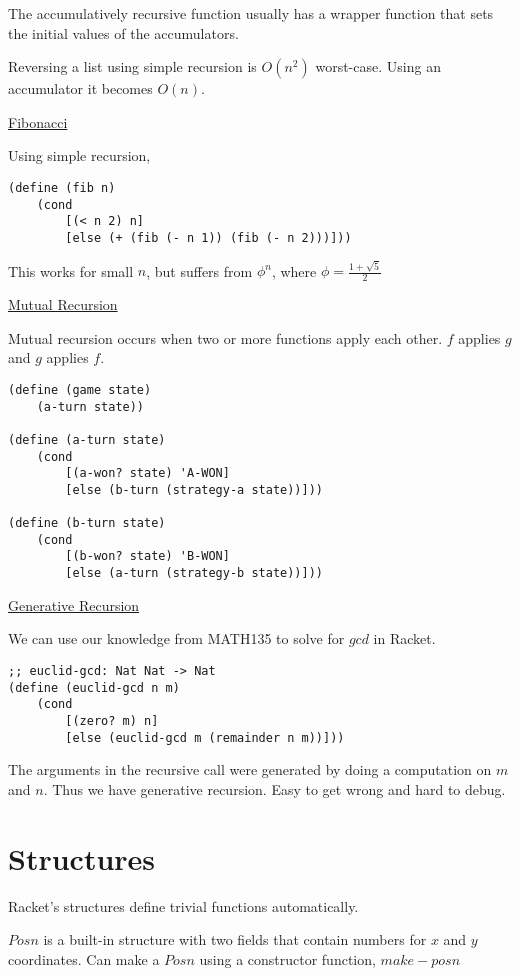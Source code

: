 \documentclass{article}
\begin{document}
The accumulatively recursive function usually has a wrapper function that sets the initial values of the accumulators. 

Reversing a list using simple recursion is $O(n^2)$ worst-case. Using an accumulator it becomes $O(n)$.

\underline{Fibonacci}

Using simple recursion,
\begin{lstlisting}
(define (fib n)
    (cond
        [(< n 2) n]
        [else (+ (fib (- n 1)) (fib (- n 2)))]))
\end{lstlisting}
This works for small $n$, but suffers from $\phi^n$, where $\phi = \frac{1 + \sqrt{5}}{2}$


\underline{Mutual Recursion}

Mutual recursion occurs when two or more functions apply each other. $f$ applies $g$ and $g$ applies $f$. 

\begin{lstlisting}
(define (game state)
    (a-turn state))

(define (a-turn state)
    (cond
        [(a-won? state) 'A-WON]
        [else (b-turn (strategy-a state))]))

(define (b-turn state)
    (cond
        [(b-won? state) 'B-WON]
        [else (a-turn (strategy-b state))]))
\end{lstlisting}

\underline{Generative Recursion}

We can use our knowledge from MATH135 to solve for $gcd$ in Racket. 

\begin{lstlisting}
;; euclid-gcd: Nat Nat -> Nat
(define (euclid-gcd n m)
    (cond
        [(zero? m) n]
        [else (euclid-gcd m (remainder n m))]))
\end{lstlisting}

The arguments in the recursive call were generated by doing a computation on $m$ and $n$. Thus we have generative recursion. Easy to get wrong and hard to debug. 

\section{Structures}

Racket's structures define trivial functions automatically. 

$Posn$ is a built-in structure with two fields that contain numbers for $x$ and $y$ coordinates. Can make a $Posn$ using a constructor function, $make-posn$
\end{document}
